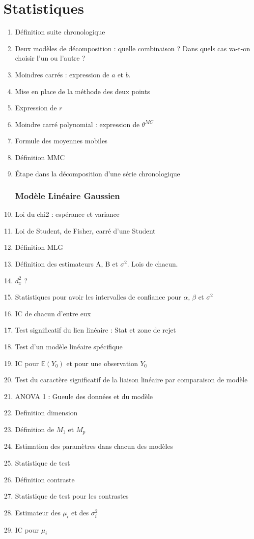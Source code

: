 \documentclass{article}
\begin{document}
\part{Statistiques}
\begin{enumerate}
\section{Série chronologique}
\item Définition suite chronologique
\item Deux modèles de décomposition : quelle combinaison ? Dans quels cas va-t-on choisir l'un ou l'autre ?
\item Moindres carrés : expression de $a$ et $b$. 
\item Mise en place de la méthode des deux points
\item Expression de $r$
\item Moindre carré polynomial : expression de $\theta^{MC}$
\item Formule des moyennes mobiles
\item Définition MMC
\item Étape dans la décomposition d'une série chronologique
\section{Modèle Linéaire Gaussien}
\item Loi du chi2 : espérance et variance
\item Loi de Student, de Fisher, carré d'une Student
\item Définition MLG
\item Définition des estimateurs A, B et $\sigma^2$. Lois de chacun.
\item $d_x^2$ ?
\item Statistiques pour avoir les intervalles de confiance pour $\alpha$, $\beta$ et $\sigma^2$
\item IC de chacun d'entre eux
\item Test significatif du lien linéaire : Stat et zone de rejet
\item Test d'un modèle linéaire spécifique
\item IC pour $\mathbb{E}(Y_0)$ et pour une observation $Y_0$
\item Test du caractère significatif de la liaison linéaire par comparaison de modèle
\item ANOVA 1 : Gueule des données et du modèle
\item Definition dimension
\item Définition de $M_1$ et $M_p$
\item Estimation des paramètres dans chacun des modèles
\item Statistique de test
\item Définition contraste
\item Statistique de test pour les contrastes
\item Estimateur des $\mu_i$ et des $\sigma_i^2$
\item IC pour $\mu_i$

\end{enumerate}
\end{document}
